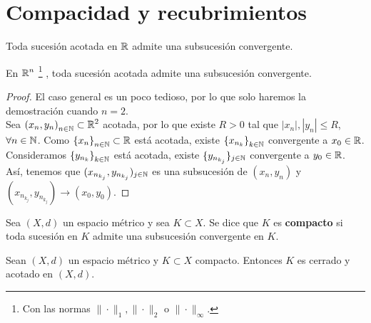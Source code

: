 \section{Compacidad y recubrimientos}
\begin{theorem}
Toda sucesión acotada en $\displaystyle \mathbb{R} $ admite una subsucesión convergente.
\end{theorem}
\begin{colorary}
En $\displaystyle \mathbb{R}^{n} $ \footnote{Con las normas $\displaystyle \| \cdot \|_{1}, \| \cdot \|_{2} $ o $\displaystyle \| \cdot \|_{\infty} $.} , toda sucesión acotada admite una subsucesión convergente. 
\end{colorary}
\begin{proof}
	El caso general es un poco tedioso, por lo que solo haremos la demostración cuando $\displaystyle n = 2 $. \\ 
	Sea $\displaystyle \left(x_{n}, y_{n}\right)_{n\in\mathbb{N}} \subset \mathbb{R}^{2} $ acotada, por lo que existe $\displaystyle R > 0 $ tal que $\displaystyle \left|x_{n}\right|, \left|y_{n}\right| \leq R $, $\displaystyle \forall n \in \mathbb{N} $. Como $\displaystyle \left\{ x_{n}\right\} _{n \in \mathbb{N}} \subset \mathbb{R}$ está acotada, existe $\displaystyle \left\{ x_{n_{k}}\right\} _{k \in \mathbb{N}} $ convergente a $\displaystyle x_{0} \in \mathbb{R} $. Consideramos $\displaystyle \left\{ y_{n_{k}}\right\} _{k \in \mathbb{N}} $ está acotada, existe $\displaystyle \{ y_{n_{k_{j}}}\} _{j \in \mathbb{N}} $ convergente a $\displaystyle y_{0} \in \mathbb{R} $.
	Así, tenemos que $\displaystyle (x_{n_{k_{j}}}, y_{n_{k_{j}}})_{j \in \mathbb{N}} $ es una subsucesión de $\displaystyle \left(x_{n}, y_{n}\right) $ y $\displaystyle (x_{n_{k_{j}}}, y_{n_{k_{j}}}) \to \left(x_{0}, y_{0}\right) $.
\end{proof}
\begin{definition}
Sea $\displaystyle \left(X,d\right) $ un espacio métrico y sea $\displaystyle K \subset X $. Se dice que $\displaystyle K $ es \textbf{compacto} si toda sucesión en $\displaystyle K $ admite una subsucesión convergente en $\displaystyle K $.
\end{definition}
\begin{lema}
Sean $\displaystyle \left(X,d\right) $ un espacio métrico y $\displaystyle K \subset X $ compacto. Entonces $\displaystyle K $ es cerrado y acotado en $\displaystyle \left(X,d\right) $.
\end{lema}
